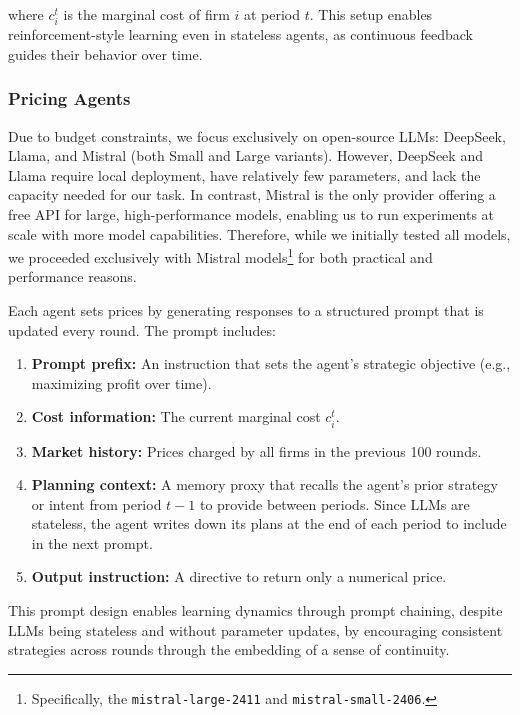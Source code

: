 where \( c_i^t \) is the marginal cost of firm \( i \) at period \( t \). This setup enables reinforcement-style learning even in stateless agents, as continuous feedback guides their behavior over time.

\subsubsection*{Pricing Agents}

Due to budget constraints, we focus exclusively on open-source LLMs: DeepSeek, Llama, and Mistral (both Small and Large variants). However, DeepSeek and Llama require local deployment, have relatively few parameters, and lack the capacity needed for our task. In contrast, Mistral is the only provider offering a free API for large, high-performance models, enabling us to run experiments at scale with more model capabilities. Therefore, while we initially tested all models, we proceeded exclusively with Mistral models\footnote{Specifically, the \texttt{mistral-large-2411} and \texttt{mistral-small-2406}.} for both practical and performance reasons.

Each agent sets prices by generating responses to a structured prompt that is updated every round. The prompt includes:

\begin{enumerate}
    \item \textbf{Prompt prefix:} An instruction that sets the agent’s strategic objective (e.g., maximizing profit over time).
    \item \textbf{Cost information:} The current marginal cost $c_i^t$.
    \item \textbf{Market history:} Prices charged by all firms in the previous 100 rounds.
    \item \textbf{Planning context:} A memory proxy that recalls the agent’s prior strategy or intent from period $t-1$ to provide  between periods. Since LLMs are stateless, the agent writes down its plans at the end of each period to include in the next prompt. 
    \item \textbf{Output instruction:} A directive to return only a numerical price.
\end{enumerate}

This prompt design enables learning dynamics through prompt chaining, despite LLMs being stateless and without parameter updates, by encouraging consistent strategies across rounds through the embedding of a sense of continuity.


